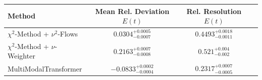    \begin{tabular}{lccc}
        \toprule
        Method & Mean Rel. Deviation $E(t)$ & Rel. Resolution $E(t)$ \\
        \midrule
        $\chi^2$-Method + $\nu^2$-Flows & $0.0304^{+0.0005}_{-0.0007}$ & $0.4493^{+0.0018}_{-0.0011}$ \\
        $\chi^2$-Method + $\nu$-Weighter & $0.2163^{+0.0007}_{-0.0008}$ & $0.521^{+0.004}_{-0.002}$ \\
        MultiModalTransformer & $-0.0833^{+0.0002}_{-0.0004}$ & $0.2317^{+0.0007}_{-0.0005}$ \\
        \bottomrule
    \end{tabular}
